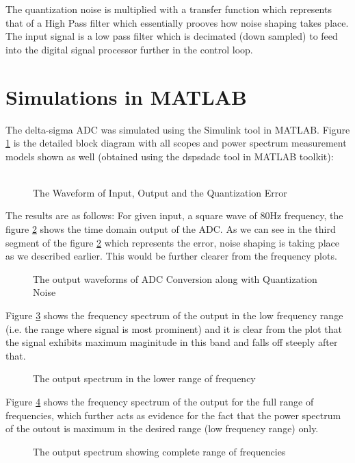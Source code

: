 \documentclass[colorlinks=true,pdfstartview=FitV,linkcolor=blue,
            citecolor=red,urlcolor=magenta]{ligodoc}
\begin{document}
The quantization noise is multiplied with a transfer function which represents that of a High Pass filter which essentially prooves how noise shaping takes place. The input signal is a low pass filter which is decimated (down sampled) to feed into the digital signal processor further in the control loop.

\section{Simulations in MATLAB}
The delta-sigma ADC was simulated using the Simulink tool in MATLAB.
Figure \ref{simulink} is the detailed block diagram with all scopes and power spectrum measurement models shown as well (obtained using the dspsdadc tool in MATLAB toolkit): \\ \\
\begin{figure}[htbp]
 
  \centering
  
  \caption{The Waveform of Input, Output and the Quantization Error}
\label{simulink}
\end{figure}
The results are as follows:
For given input, a square wave of 80Hz frequency, the figure \ref{time} shows the time domain output of the ADC. As we can see in the third segment of the figure \ref{time} which represents the error, noise shaping is taking place as we described earlier. This would be further clearer from the frequency plots. 
\begin{figure}[htbp]
 
  \centering
  
  \caption{The output waveforms of ADC Conversion along with Quantization Noise}
 \label{time}
\end{figure}
Figure \ref{out1} shows the frequency spectrum of the output in the low frequency range (i.e. the range where signal is most prominent) and it is clear from the plot that the signal exhibits maximum maginitude in this band and falls off steeply after that. 
\begin{figure}[htbp]
 
  \centering
  
  \caption{The output spectrum in the lower range of frequency}
 \label{out1}
\end{figure}
Figure \ref{out2} shows the frequency spectrum of the output for the full range of frequencies, which further acts as evidence for the fact that the power spectrum of the outout is maximum in the desired range (low frequency range) only. 
\begin{figure}[htbp]
 
  \centering
  
  \caption{The output spectrum showing complete range of frequencies}
 \label{out2}
\end{figure}
\end{document}
